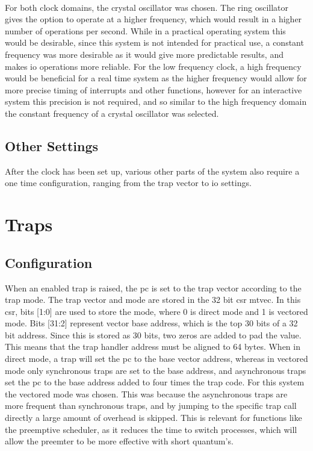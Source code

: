 \\
For both clock domains, the crystal oscillator was chosen. The ring oscillator gives the option to operate at a higher frequency, which would result in a higher number of operations per second. While in a practical operating system this would be desirable, since this system is not intended for practical use, a constant frequency was more desirable as it would give more predictable results, and makes \ac{io} operations more reliable. For the low frequency clock, a high frequency would be beneficial for a real time system as the higher frequency would allow for more precise timing of interrupts and other functions, however for an interactive system this precision is not required, and so similar to the high frequency domain the constant frequency of a crystal oscillator was selected.
\subsection{Other Settings}
After the clock has been set up, various other parts of the system also require a one time configuration, ranging from the trap vector to \ac{io} settings.
\section{Traps}
\subsection{Configuration}
When an enabled trap is raised, the pc is set to the trap vector according to the trap mode. The trap vector and mode are stored in the 32 bit csr mtvec. In this csr, bits [1:0] are used to store the mode, where 0 is direct mode and 1 is vectored mode. Bits [31:2] represent vector base address, which is the top 30 bits of a 32 bit address. Since this is stored as 30 bits, two zeros are added to pad the value. This means that the trap handler address must be aligned to 64 bytes. When in direct mode, a trap will set the pc to the base vector address, whereas in vectored mode only synchronous traps are set to the base address, and asynchronous traps set the pc to the base address added to four times the trap code. For this system the vectored mode was chosen. This was because the asynchronous traps are more frequent than synchronous traps, and by jumping to the specific trap call directly a large amount of overhead is skipped. This is relevant for functions like the preemptive scheduler, as it reduces the time to switch processes, which will allow the preemter to be more effective with short quantum's.
